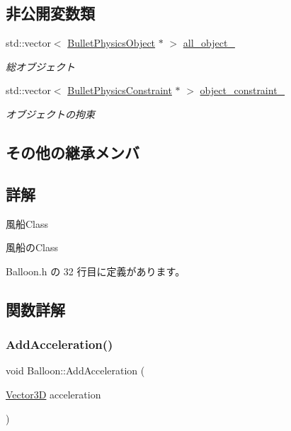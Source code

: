 \subsection*{非公開変数類}
\begin{DoxyCompactItemize}
\item 
std\+::vector$<$ \mbox{\hyperlink{class_bullet_physics_object}{Bullet\+Physics\+Object}} $\ast$ $>$ \mbox{\hyperlink{class_balloon_afd563b3d30d5095afe3879fe6e609023}{all\+\_\+object\+\_\+}}
\begin{DoxyCompactList}\small\item\em 総オブジェクト \end{DoxyCompactList}\item 
std\+::vector$<$ \mbox{\hyperlink{class_bullet_physics_constraint}{Bullet\+Physics\+Constraint}} $\ast$ $>$ \mbox{\hyperlink{class_balloon_a18e7a10f252ab3075c3c58640425bd8c}{object\+\_\+constraint\+\_\+}}
\begin{DoxyCompactList}\small\item\em オブジェクトの拘束 \end{DoxyCompactList}\end{DoxyCompactItemize}
\subsection*{その他の継承メンバ}


\subsection{詳解}
風船\+Class 

風船の\+Class 

 Balloon.\+h の 32 行目に定義があります。



\subsection{関数詳解}
\mbox{\label{class_balloon_ab29a0490f62947c1cd0e61efb9dc1c1c}} 
\subsubsection{\texorpdfstring{Add\+Acceleration()}{AddAcceleration()}}
{\footnotesize\ttfamily void Balloon\+::\+Add\+Acceleration (\begin{DoxyParamCaption}\item[{\mbox{\hyperlink{class_vector3_d}{Vector3D}}}]{acceleration }\end{DoxyParamCaption})}



